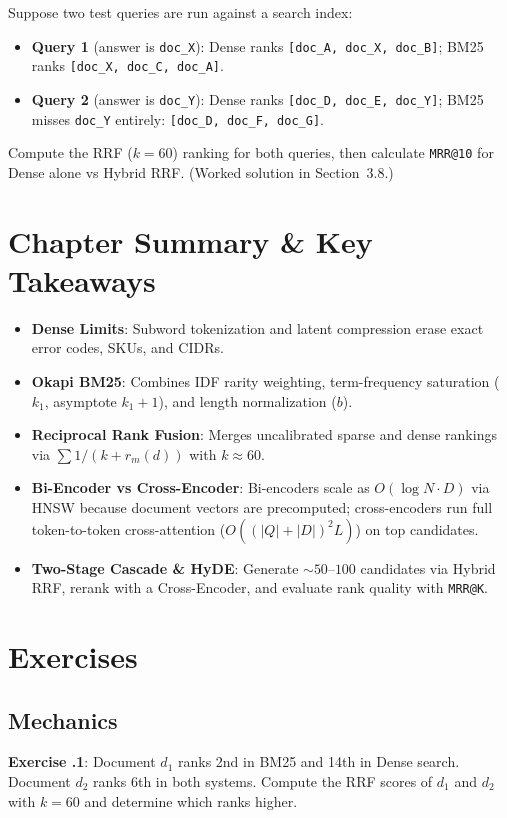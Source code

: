 \begin{tryityourselfbox}
Suppose two test queries are run against a search index:
\begin{itemize}
  \item \textbf{Query 1} (answer is \texttt{doc\_X}): Dense ranks \texttt{[doc\_A, doc\_X, doc\_B]}; BM25 ranks \texttt{[doc\_X, doc\_C, doc\_A]}.
  \item \textbf{Query 2} (answer is \texttt{doc\_Y}): Dense ranks \texttt{[doc\_D, doc\_E, doc\_Y]}; BM25 misses \texttt{doc\_Y} entirely: \texttt{[doc\_D, doc\_F, doc\_G]}.
\end{itemize}
Compute the RRF ($k=60$) ranking for both queries, then calculate \texttt{MRR@10} for Dense alone vs Hybrid RRF. (Worked solution in Section~3.8.)
\end{tryityourselfbox}

\section{Chapter Summary \protect\& Key Takeaways}
\begin{itemize}[leftmargin=18pt]
  \item \textbf{Dense Limits}: Subword tokenization and latent compression erase exact error codes, SKUs, and CIDRs.
  \item \textbf{Okapi BM25}: Combines IDF rarity weighting, term-frequency saturation ($k_1$, asymptote $k_1+1$), and length normalization ($b$).
  \item \textbf{Reciprocal Rank Fusion}: Merges uncalibrated sparse and dense rankings via $\sum 1/(k + r_m(d))$ with $k \approx 60$.
  \item \textbf{Bi-Encoder vs Cross-Encoder}: Bi-encoders scale as $O(\log N \cdot D)$ via HNSW because document vectors are precomputed; cross-encoders run full token-to-token cross-attention ($O((|Q|+|D|)^2 L)$) on top candidates.
  \item \textbf{Two-Stage Cascade \& HyDE}: Generate $\sim 50\text{--}100$ candidates via Hybrid RRF, rerank with a Cross-Encoder, and evaluate rank quality with \texttt{MRR@K}.
\end{itemize}

\section{Exercises}

\subsection*{Mechanics}
\textbf{Exercise \thechapter.1}: Document $d_1$ ranks 2nd in BM25 and 14th in Dense search. Document $d_2$ ranks 6th in both systems. Compute the RRF scores of $d_1$ and $d_2$ with $k = 60$ and determine which ranks higher.

